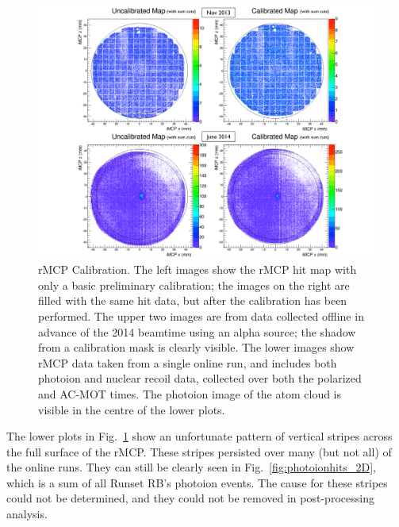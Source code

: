 \begin{figure}[h!tb]
	\centering
	\includegraphics[width=.999\linewidth]
	{Figures/rMCP_Calibration}
	\caption[rMCP Calibration]{rMCP Calibration.  The left images show the rMCP hit map with only a basic preliminary calibration; the images on the right are filled with the same hit data, but after the calibration has been performed.  The upper two images are from data collected offline in advance of the 2014 beamtime using an alpha source; the shadow from a calibration mask is clearly visible.  The lower images show rMCP data taken from a single online run, and includes both photoion and nuclear recoil data, collected over both the polarized and AC-MOT times.  The photoion image of the atom cloud is visible in the centre of the lower plots.  
	}
	\label{fig:rmcp_calibration}
\end{figure}

The lower plots in Fig.~\ref{fig:rmcp_calibration} show an unfortunate pattern of vertical stripes across the full surface of the rMCP.  These stripes persisted over many (but not all) of the online runs.  They can still be clearly seen in Fig.~\ref{fig:photoionhits_2D}, which is a sum of all Runset RB's photoion events. The cause for these stripes could not be determined, and they could not be removed in post-processing analysis.  

